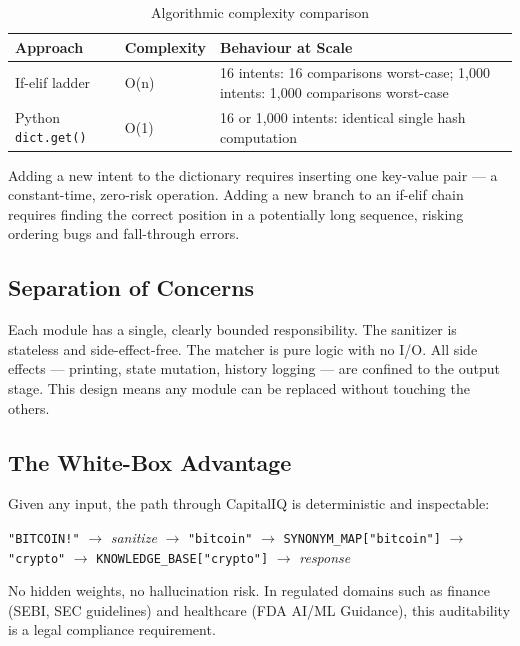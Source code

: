 \documentclass[12pt, a4paper]{article}
\begin{document}
\begin{table}[ht]
\centering
\caption{Algorithmic complexity comparison}
\label{tab:complexity}
\begin{tabularx}{\linewidth}{l l X}
\toprule
\rowcolor{tabh!12}
Approach & Complexity & Behaviour at Scale \\
\midrule
If-elif ladder & O(n) & 16 intents: 16 comparisons worst-case;
1{,}000 intents: 1{,}000 comparisons worst-case \\[4pt]
Python \texttt{dict.get()} & O(1) & 16 or 1{,}000 intents: identical
single hash computation \\
\bottomrule
\end{tabularx}
\end{table}

Adding a new intent to the dictionary requires inserting one key-value pair
--- a constant-time, zero-risk operation. Adding a new branch to an if-elif
chain requires finding the correct position in a potentially long sequence,
risking ordering bugs and fall-through errors.

\subsection{Separation of Concerns}

Each module has a single, clearly bounded responsibility. The sanitizer is
stateless and side-effect-free. The matcher is pure logic with no I/O. All
side effects --- printing, state mutation, history logging --- are confined
to the output stage. This design means any module can be replaced without
touching the others.

\subsection{The White-Box Advantage}

Given any input, the path through CapitalIQ is deterministic and inspectable:

\begin{center}
  \texttt{"BITCOIN!"} $\to$ \textit{sanitize} $\to$
  \texttt{"bitcoin"} $\to$ \texttt{SYNONYM\_MAP["bitcoin"]} $\to$
  \texttt{"crypto"} $\to$ \texttt{KNOWLEDGE\_BASE["crypto"]} $\to$ \textit{response}
\end{center}

No hidden weights, no hallucination risk. In regulated domains
such as finance (SEBI, SEC guidelines) and healthcare (FDA AI/ML Guidance),
this auditability is a legal compliance requirement.
\end{document}

